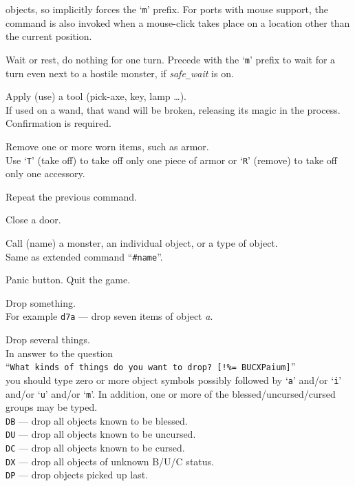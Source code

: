 objects, so implicitly forces the `{\tt m}' prefix.
For ports with mouse
support, the command is also invoked when a mouse-click takes place on a
location other than the current position.
\item[\tb{.}]
Wait or rest, do nothing for one turn.
Precede with the `{\tt m}' prefix
to wait for a turn even next to a hostile monster, if {\it safe\verb+_+wait\/}
is on.
\item[\tb{a}]
Apply (use) a tool (pick-axe, key, lamp \ldots).\\
If used on a wand, that wand will be broken, releasing its magic in the
process.
Confirmation is required.
\item[\tb{A}]
Remove one or more worn items, such as armor.\\
Use `{\tt T}' (take off) to take off only one piece of armor
or `{\tt R}' (remove) to take off only one accessory.
\item[\tb{\^{}A}]
Repeat the previous command.
\item[\tb{c}]
Close a door.
\item[\tb{C}]
Call (name) a monster, an individual object, or a type of object.\\
Same as extended command ``{\tt \#name}''.
\item[\tb{\^{}C}]
Panic button.  Quit the game.
\item[\tb{d}]
Drop something.\\
For example {\tt d7a} --- drop seven items of object
{\it a}.
\item[\tb{D}]
Drop several things.\\
In answer to the question\\
``{\tt What kinds of things do you want to drop? [!\%= BUCXPaium]}''\\
you should type zero or more object symbols possibly followed by
`{\tt a}' and/or `{\tt i}' and/or `{\tt u}' and/or `{\tt m}'.
In addition, one or more of
the bless\-ed/\-un\-curs\-ed/\-curs\-ed groups may be typed.\\
{\tt DB}  --- drop all objects known to be blessed.\\
{\tt DU}  --- drop all objects known to be uncursed.\\
{\tt DC}  --- drop all objects known to be cursed.\\
{\tt DX}  --- drop all objects of unknown B/U/C status.\\
{\tt DP}  --- drop objects picked up last.\\
